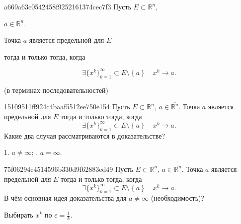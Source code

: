\begin{note}{a669a63c0542458f9252161374cec7f3}
    Пусть \({ E \subset \mathbb R^{n} }\),\: \begin{icloze}{4}\({ a \in \overline{\mathbb R^{n}} }\).\end{icloze} \begin{icloze}{2}Точка \({ a }\) является предельной для \({ E }\)\end{icloze} \begin{icloze}{3}тогда и только тогда, когда\end{icloze}
    \begin{icloze}{1}
        \[
            \exists \{ x^{k} \}_{k = 1}^{\infty} \subset E \setminus \left\{ a \right\} \quad x^{k} \to a.
        \]
    \end{icloze}

    \begin{center}
        \tiny (в терминах последовательностей)
    \end{center}
\end{note}

\begin{note}{15109511ff924c4baaf5512ee750e154}
    Пусть \({ E \subset \mathbb R^{n} }\),\: \({ a \in \overline{\mathbb R^{n}} }\). Точка \({ a }\) является предельной для \({ E }\) тогда и только тогда, когда
    \[
        \exists \{ x^{k} \}_{k = 1}^{\infty} \subset E \setminus \left\{ a \right\} \quad x^{k} \to a.
    \]
    Какие два случая рассматриваются в доказательстве?

    \begin{cloze}{1}
        1. \({ a \neq \infty }\); .  \({ a = \infty }\).
    \end{cloze}
\end{note}

\begin{note}{75f06294c4514596b330d9f62883ed49}
    Пусть \({ E \subset \mathbb R^{n} }\),\: \({ a \in \overline{\mathbb R^{n}} }\). Точка \({ a }\) является предельной для \({ E }\) тогда и только тогда, когда
    \[
        \exists \{ x^{k} \}_{k = 1}^{\infty} \subset E \setminus \left\{ a \right\} \quad x^{k} \to a.
    \]
    В чём основная идея доказательства для \({ a \neq \infty }\) (необходимость)?

    \begin{cloze}{1}
        Выбирать \({ x^{k} }\) по \({ \varepsilon = \frac{1}{k} }\).
    \end{cloze}
\end{note}

